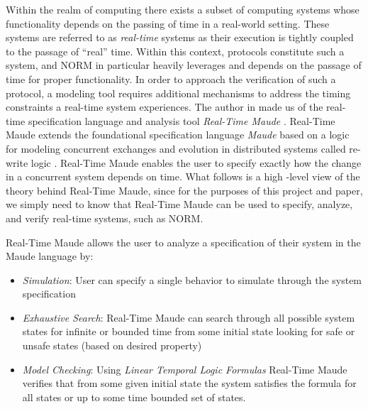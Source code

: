 \documentclass[10pt, journal]{IEEEtran}
\begin{document}
Within the realm of computing there exists a subset of computing systems whose functionality depends on the passing of time in a real-world setting. These systems are referred to as \textit{real-time} systems as their execution is tightly coupled to the passage of ``real'' time. Within this context, protocols constitute such a system, and NORM in particular heavily leverages and depends on the passage of time for proper functionality. In order to approach the verification of such a protocol, a modeling tool requires additional mechanisms to address the timing constraints a real-time system experiences. The author in \cite{Lien2004} made us of the real-time specification language and analysis tool \textit{Real-Time Maude} \cite{rtmaudeUrl, Olvezky2004}. Real-Time Maude extends the foundational specification language \textit{Maude} \cite{maudeUrl, Clavel2002} based on a logic for modeling concurrent exchanges and evolution in distributed systems called re-write logic \cite{Meseguer1992}. Real-Time Maude enables the user to specify exactly how the change in a concurrent system depends on time. What follows is a high -level view of the theory behind Real-Time Maude, since for the purposes of this project and paper, we simply need to know that Real-Time Maude can be used to specify, analyze, and verify real-time systems, such as NORM.

Real-Time Maude allows the user to analyze a specification of their system in the Maude language by:
\begin{itemize}
	\item \textit{Simulation}: User can specify a single behavior to simulate through the system specification
	\item \textit{Exhaustive Search}: Real-Time Maude can search through all possible system states for infinite or bounded time from some initial state looking for safe or unsafe states (based on desired property)
	\item \textit{Model Checking}: Using \textit{Linear Temporal Logic Formulas} Real-Time Maude verifies that from some given initial state the system satisfies the formula for all states or up to some time bounded set of states.
\end{itemize}
\end{document}
